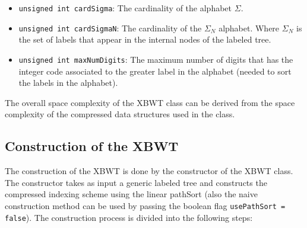 \begin{itemize}
    \item \texttt{unsigned int cardSigma}: The cardinality of the alphabet $\Sigma$.
    \item \texttt{unsigned int cardSigmaN}: The cardinality of the $\Sigma_N$ alphabet. Where $\Sigma_N$ is the set of labels that appear in the internal nodes of the labeled tree.
    \item \texttt{unsigned int maxNumDigits}: The maximum number of digits that has the integer code associated to the greater label in the alphabet (needed to sort the labels in the alphabet).
\end{itemize}

The overall space complexity of the XBWT class can be derived from the space complexity of the compressed data structures used in the class. 

\subsection{Construction of the XBWT}
The construction of the XBWT is done by the constructor of the XBWT class. The constructor takes as input a generic labeled tree and constructs the compressed indexing scheme using the linear pathSort (also the naive construction method can be used by passing the boolean flag \texttt{usePathSort = false}). The construction process is divided into the following steps:

